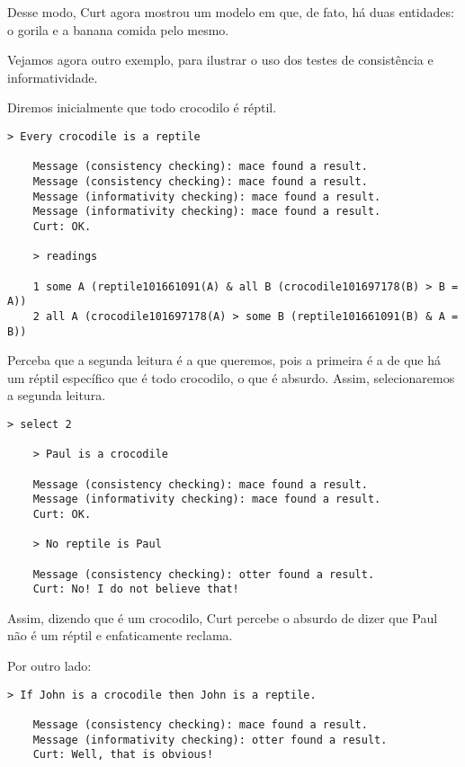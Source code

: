 	Desse modo, Curt agora mostrou um modelo em que, de fato, há duas entidades: o gorila  e a banana comida pelo mesmo.
	
	Vejamos agora outro exemplo, para ilustrar o uso dos testes de consistência e informatividade.
	
	Diremos inicialmente que todo crocodilo é réptil.
	
	\begin{Verbatim}[fontseries=b,gobble=1]
	> Every crocodile is a reptile
	
	Message (consistency checking): mace found a result.
	Message (consistency checking): mace found a result.
	Message (informativity checking): mace found a result.
	Message (informativity checking): mace found a result.
	Curt: OK.
	
	> readings
	
	1 some A (reptile101661091(A) & all B (crocodile101697178(B) > B = A))
	2 all A (crocodile101697178(A) > some B (reptile101661091(B) & A = B))
	\end{Verbatim}
	
	Perceba que a segunda leitura é a que queremos, pois a primeira é a de que há um réptil específico que é todo crocodilo, o que é absurdo. Assim, selecionaremos a segunda leitura.
	
	\begin{Verbatim}[fontseries=b,gobble=1]
	> select 2
	
	> Paul is a crocodile
	
	Message (consistency checking): mace found a result.
	Message (informativity checking): mace found a result.
	Curt: OK.
	
	> No reptile is Paul
	
	Message (consistency checking): otter found a result.
	Curt: No! I do not believe that!
	\end{Verbatim}

	Assim, dizendo que  é um crocodilo, Curt percebe o absurdo de dizer que Paul não é um réptil e enfaticamente reclama.
	
	Por outro lado:
	
	\begin{Verbatim}[fontseries=b,gobble=1]
	> If John is a crocodile then John is a reptile.
	
	Message (consistency checking): mace found a result.
	Message (informativity checking): otter found a result.
	Curt: Well, that is obvious!
	\end{Verbatim}
	

